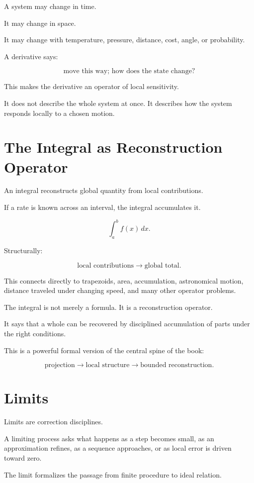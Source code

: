 \documentclass[11pt]{book}
\begin{document}
A system may change in time.

It may change in space.

It may change with temperature, pressure, distance, cost, angle, or probability.

A derivative says:

\[
\text{move this way; how does the state change?}
\]

This makes the derivative an operator of local sensitivity.

It does not describe the whole system at once. It describes how the system responds locally to a chosen motion.

\section{The Integral as Reconstruction Operator}

An integral reconstructs global quantity from local contributions.

If a rate is known across an interval, the integral accumulates it.

\[
\int_a^b f(x)\,dx.
\]

Structurally:

\[
\text{local contributions}
\rightarrow
\text{global total}.
\]

This connects directly to trapezoids, area, accumulation, astronomical motion, distance traveled under changing speed, and many other operator problems.

The integral is not merely a formula. It is a reconstruction operator.

It says that a whole can be recovered by disciplined accumulation of parts under the right conditions.

This is a powerful formal version of the central spine of the book:

\[
\text{projection}
\rightarrow
\text{local structure}
\rightarrow
\text{bounded reconstruction}.
\]

\section{Limits}

Limits are correction disciplines.

A limiting process asks what happens as a step becomes small, as an approximation refines, as a sequence approaches, or as local error is driven toward zero.

The limit formalizes the passage from finite procedure to ideal relation.
\end{document}
